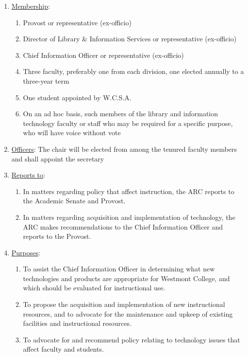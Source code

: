 					\begin{enumerate}[label=\alph*)]
						\item{\underline{Membership}:
							\begin{enumerate}[label=\arabic*)]
								\item{Provost or representative (ex-officio)}
								\item{Director of Library \& Information Services or representative (ex-officio)}
								\item{Chief Information Officer or representative (ex-officio)}
								\item{Three faculty, preferably one from each division, one elected annually to a three-year term}
								\item{One student appointed by W.C.S.A.}
								\item{On an ad hoc basis, such members of the library and information technology faculty or staff who may be required for a specific purpose, who will have voice without vote}
							\end{enumerate}
						}
						\item{\underline{Officers}:
							The chair will be elected from among the tenured faculty members and shall appoint the secretary}
						\item{\underline{Reports to}:
							\begin{enumerate}[label=\arabic*)]
								\item{In matters regarding policy that affect instruction, the ARC reports to the Academic Senate and Provost.}
								\item{In matters regarding acquisition and implementation of technology, the ARC makes recommendations to the Chief Information Officer and reports to the Provost.}
							\end{enumerate}
						}
						\item{\underline{Purposes}:
							\begin{enumerate}[label=\arabic*)]
								\item{To assist the Chief Information Officer in determining what new technologies and products are appropriate for Westmont College, and which should be evaluated for instructional use.}
								\item{To propose the acquisition and implementation of new instructional resources, and to advocate for the maintenance and upkeep of existing facilities and instructional resources.}
								\item{To advocate for and recommend policy relating to technology issues that affect faculty and students.}

\end{enumerate}}
\end{enumerate}

